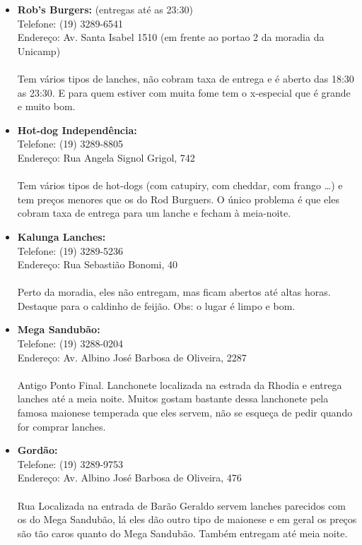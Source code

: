 \begin{itemize}
\item   \textbf{Rob's Burgers:} (entregas até as 23:30)
        \\Telefone: (19) 3289-6541
        \\Endereço: Av. Santa Isabel 1510 (em frente ao portao 2 da moradia da Unicamp)
        \\\\Tem vários tipos de lanches, não cobram taxa de entrega e é aberto
        das 18:30 as 23:30. E para quem estiver com muita fome tem o x-especial
        que é grande e muito bom.

\item   \textbf{Hot-dog Independência:}
        \\Telefone: (19) 3289-8805
        \\Endereço: Rua Angela Signol Grigol, 742
        \\\\Tem vários tipos de hot-dogs (com catupiry, com cheddar, com frango
        {\dots}) e tem preços menores que os do Rod Burguers. O único problema é
        que eles cobram taxa de entrega para um lanche e fecham à meia-noite.

\item   \textbf{Kalunga Lanches:}
        \\Telefone: (19) 3289-5236
        \\Endereço: Rua Sebastião Bonomi, 40
        \\\\Perto da moradia, eles não entregam, mas ficam abertos até altas
        horas. Destaque para o caldinho de feijão. Obs: o lugar é limpo e bom.

\item   \textbf{Mega Sandubão:}
        \\Telefone: (19) 3288-0204
        \\Endereço: Av. Albino José Barbosa de Oliveira, 2287
        \\\\Antigo Ponto Final. Lanchonete localizada na estrada da Rhodia e entrega lanches até a
        meia noite. Muitos gostam bastante dessa lanchonete pela famosa maionese
        temperada que eles servem, não se esqueça de pedir quando for comprar
        lanches.

\item   \textbf{Gordão:}
        \\Telefone: (19) 3289-9753
        \\Endereço: Av. Albino José Barbosa de Oliveira, 476
        \\\\Rua Localizada na entrada de Barão Geraldo servem lanches parecidos
        com os do Mega Sandubão, lá eles dão outro tipo de maionese e em geral os
        preços são tão caros quanto do Mega Sandubão. Também entregam até meia
        noite.


\end{itemize}
